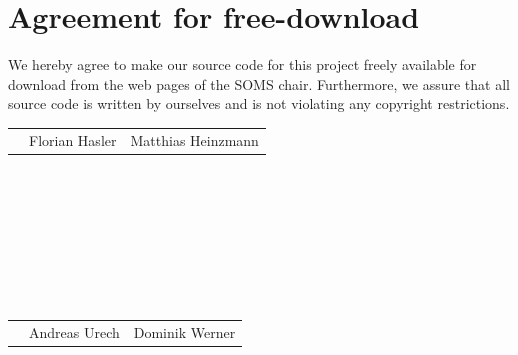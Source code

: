 \documentclass[11pt]{article}
\begin{document}
\renewcommand{\figurename}{Figure}


\newpage


\newpage
\section*{Agreement for free-download}
\bigskip


\bigskip


\large We hereby agree to make our source code for this project freely available for download from the web pages of the SOMS chair. Furthermore, we assure that all source code is written by ourselves and is not violating any copyright restrictions.

\begin{center}

\bigskip


\bigskip

\begin{tabular}{@{}p{3.3cm}@{}p{6cm}@{}@{}p{6cm}@{}}
\begin{minipage}{3cm}

\end{minipage}
&
\begin{minipage}{6cm}
\large Florian Hasler
\end{minipage}
&
\begin{minipage}{6cm}
\large Matthias Heinzmann
\end{minipage}
\end{tabular}
\ \\
\ \\
\ \\
\ \\
\ \\
\ \\
\ \\
\begin{tabular}{@{}p{3.3cm}@{}p{6cm}@{}@{}p{6cm}@{}}
\begin{minipage}{3cm}
\end{minipage}
&
\begin{minipage}{6cm}
\large Andreas Urech
\end{minipage}
&
\begin{minipage}{6cm}
\large Dominik Werner
\end{minipage}
\end{tabular}
\end{center}
\newpage

\end{document}
